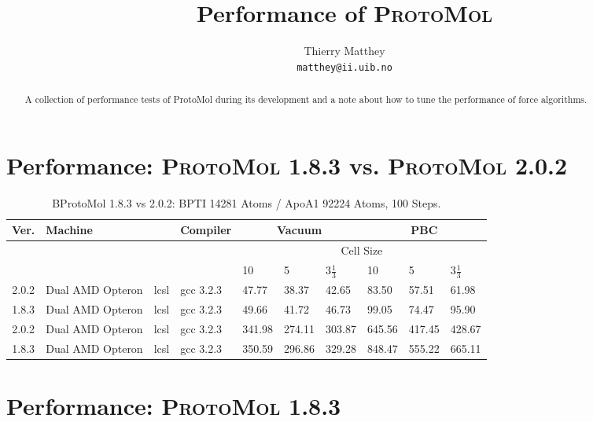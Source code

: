 \documentclass[11pt]{article}
\author{Thierry Matthey\\{\tt matthey@ii.uib.no}}
\title{Performance of \textsc{ProtoMol}}
\begin{document}
\maketitle
\begin{abstract}
A collection of performance tests of {\sc ProtoMol} during its development
and a note about how to tune the performance of force algorithms.
\end{abstract}




\section{Performance: \textsc{ProtoMol} 1.8.3 vs. \textsc{ProtoMol} 2.0.2 }
\begin{table}[htb]
\small
  \begin{center}
    \begin{tabular}{|c|p{1.7cm}|l|l|l|l|l|l|l|l|}\hline
Ver. & \multicolumn{2}{|l|}{Machine}  & Compiler & \multicolumn{3}{|c|}{Vacuum} & \multicolumn{3}{|c|}{PBC} \\\hline
 \multicolumn{4}{|c|}{}  & \multicolumn{6}{|c|}{Cell Size} \\\hline
 \multicolumn{4}{|c|}{} & 10 & 5 & 3$\frac{1}{3}$  & 10 & 5 & 3$\frac{1}{3}$ \\\hline
2.0.2 & Dual AMD Opteron & lcsl & gcc 3.2.3 &  47.77 &  38.37 &  42.65 &  83.50&  57.51 &  61.98  \\\hline
1.8.3 & Dual AMD Opteron & lcsl & gcc 3.2.3 &  49.66 &  41.72 &  46.73 &  99.05&  74.47 &  95.90  \\\hline
2.0.2 & Dual AMD Opteron & lcsl & gcc 3.2.3 & 341.98 & 274.11 & 303.87 & 645.56& 417.45 & 428.67 \\\hline
1.8.3 & Dual AMD Opteron & lcsl & gcc 3.2.3 & 350.59 & 296.86 & 329.28 & 848.47& 555.22 & 665.11 \\\hline


    \end{tabular}
  \end{center}
  \caption{BProtoMol 1.8.3 vs 2.0.2: BPTI 14281 Atoms / ApoA1 92224 Atoms, 100 Steps.}
\end{table}

\clearpage

\section{Performance: \textsc{ProtoMol} 1.8.3}
\end{document}
